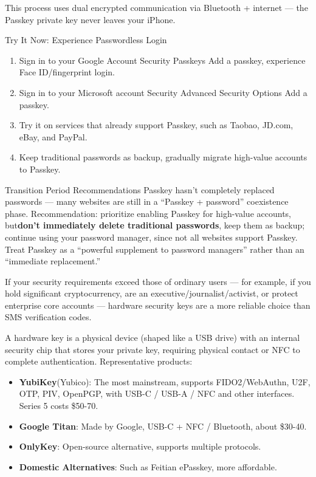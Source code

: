 This process uses dual encrypted communication via Bluetooth + internet — the Passkey private key never leaves your iPhone.

\begin{tcbpractice}{Try It Now: Experience Passwordless Login}
\begin{enumerate}
  \item Sign in to your Google Account Security Passkeys Add a passkey, experience Face ID/fingerprint login.
  \item Sign in to your Microsoft account Security Advanced Security Options Add a passkey.
  \item Try it on services that already support Passkey, such as Taobao, JD.com, eBay, and PayPal.
  \item Keep traditional passwords as backup, gradually migrate high-value accounts to Passkey.
\end{enumerate}

\end{tcbpractice}

\begin{tcbwarn}{Transition Period Recommendations}
Passkey hasn't completely replaced passwords — many websites are still in a “Passkey + password” coexistence phase. Recommendation: prioritize enabling Passkey for high-value accounts, but\textbf{don't immediately delete traditional passwords}, keep them as backup; continue using your password manager, since not all websites support Passkey. Treat Passkey as a “powerful supplement to password managers” rather than an “immediate replacement.”

\end{tcbwarn}


If your security requirements exceed those of ordinary users — for example, if you hold significant cryptocurrency, are an executive/journalist/activist, or protect enterprise core accounts — hardware security keys are a more reliable choice than SMS verification codes.


A hardware key is a physical device (shaped like a USB drive) with an internal security chip that stores your private key, requiring physical contact or NFC to complete authentication. Representative products:

\begin{itemize}
  \item \textbf{YubiKey}(Yubico): The most mainstream, supports FIDO2/WebAuthn, U2F, OTP, PIV, OpenPGP, with USB-C / USB-A / NFC and other interfaces. Series 5 costs \$50-70.
  \item \textbf{Google Titan}: Made by Google, USB-C + NFC / Bluetooth, about \$30-40.
  \item \textbf{OnlyKey}: Open-source alternative, supports multiple protocols.
  \item \textbf{Domestic Alternatives}: Such as Feitian ePasskey, more affordable.
\end{itemize}


